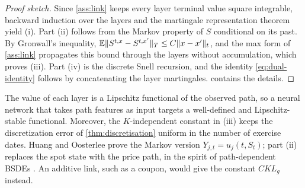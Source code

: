 \begin{proof}[Proof sketch]
Since \cref{ass:link} keeps every layer terminal value square integrable, backward induction over the layers and the martingale representation theorem yield (i). Part (ii) follows from the Markov property of $S$ conditional on its past. By Gronwall's inequality, $\mathbb{E}\lVert S^{t,x}-S^{t,x'}\rVert_T\le C\lVert x-x'\rVert_t$, and the max form of \cref{ass:link} propagates this bound through the layers without accumulation, which proves (iii). Part (iv) is the discrete Snell recursion, and the identity \eqref{eq:dual-identity} follows by concatenating the layer martingales.  contains the details.
\end{proof}

\begin{remark}\label{rem:wellposed}
The value of each layer is a Lipschitz functional of the observed path, so a neural network that takes path features as input targets a well-defined and Lipschitz-stable functional. Moreover, the $K$-independent constant in (iii) keeps the discretization error of \cref{thm:discretisation} uniform in the number of exercise dates. Huang and Oosterlee \cite[Thm.~3.1]{huang2026} prove the Markov version $Y_{j,t}=u_j(t,S_t)$; part (ii) replaces the spot state with the price path, in the spirit of path-dependent BSDEs \cite{peng2016}. An additive link, such as a coupon, would give the constant $CKL_g$ instead.
\end{remark}
